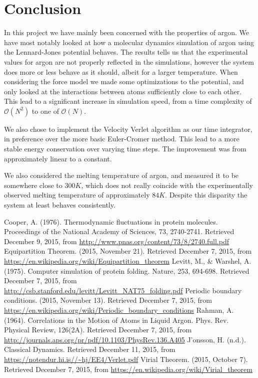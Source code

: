 \documentclass[a4paper]{article}
\begin{document}
\section{Conclusion}
\label{sec:conclusion}

In this project we have mainly been concerned with the properties of argon. We
have most notably looked at how a molecular dynamics simulation of argon using
the Lennard-Jones potential behaves.  The results tells us that the
experimental values for argon are not properly reflected in the simulations,
however the system does more or less behave as it should, albeit for a larger
temperature. When considering the force model we made some optimizations to the
potential, and only looked at the interactions between atoms sufficiently close
to each other. This lead to a significant increase in simulation speed, from a
time complexity of $\mathcal{O}(N^2)$ to one of $\mathcal{O}(N)$.

We also chose to implement the Velocity Verlet algorithm as our time
integrator, in preference over the more basic Euler-Cromer method. This lead to
a more stable energy conservation over varying time steps. The improvement was
from approximately linear to a constant. 

We also considered the melting temperature of argon, and measured it to be
somewhere close to $300K$, which does not really coincide with the
experimentally observed melting temperature of approximately $84K$. Despite
this disparity the system at least behaves consistently.

\begin{thebibliography}{9}
    Cooper, A. (1976). Thermodynamic fluctuations in protein molecules. Proceedings of the National Academy of Sciences, 73, 2740-2741. Retrieved December 9, 2015, from \url{http://www.pnas.org/content/73/8/2740.full.pdf}
    Equipartition Theorem. (2015, November 21). Retrieved December 7, 2015, from \url{https://en.wikipedia.org/wiki/Equipartition_theorem}
    Levitt, M., \& Warshel, A. (1975). Computer simulation of protein folding. Nature, 253, 694-698. Retrieved December 7, 2015, from \url{http://csb.stanford.edu/levitt/Levitt_NAT75_folding.pdf}
    Periodic boundary conditions. (2015, November 13). Retrieved December 7, 2015, from \url{https://en.wikipedia.org/wiki/Periodic_boundary_conditions}
    Rahman, A. (1964). Correlations in the Motion of Atoms in Liquid Argon. Phys. Rev. Physical Review, 126(2A). Retrieved December 7, 2015, from \url{http://journals.aps.org/pr/pdf/10.1103/PhysRev.136.A405}
    J'onsson, H. (n.d.). Classical Dynamics. Retrieved December 11, 2015, from
    \url{https://notendur.hi.is//~hj/EE4/Verlet.pdf}
    Virial Theorem. (2015, October 7). Retrieved December 7, 2015, from \url{https://en.wikipedia.org/wiki/Virial_theorem}
\end{thebibliography}
\end{document}
